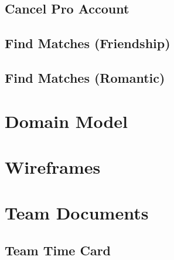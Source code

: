 \documentclass[12pt, draft]{article}
\begin{document}
\subsection{Cancel Pro Account}
\subsection{Find Matches (Friendship)}
\subsection{Find Matches (Romantic)}

\section{Domain Model}

\section{Wireframes}

\section{Team Documents}
\subsection{Team Time Card}
\end{document}
